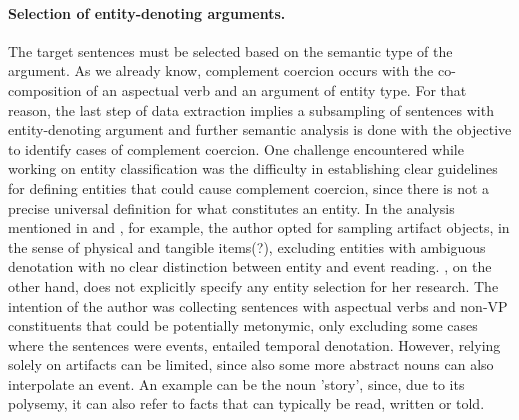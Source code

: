 \documentclass{article}
\begin{document}
\paragraph{Selection of entity-denoting arguments.} The target sentences must be selected based on the semantic type of the argument. As we already know, complement coercion occurs with the co-composition of an aspectual verb and an argument of entity type. For that reason, the last step of data extraction implies a subsampling of sentences with entity-denoting argument and further semantic analysis is done with the objective to identify cases of complement coercion. 
One challenge encountered while working on entity classification was the difficulty in establishing clear guidelines for defining entities that could cause complement coercion, since there is not a precise universal definition for what constitutes an entity. In the analysis mentioned in \textcite{rud_covert_2011} and \textcite{zarcone_logical_2012}, for example, the author opted for sampling artifact objects, in the sense of physical and tangible %
items(?), excluding entities with ambiguous denotation with no clear distinction between entity and event reading. %
\textcite{verspoor_conventionality-governed_1997}, on the other hand, does not explicitly specify any
entity selection for her research. The intention of the author was collecting sentences with aspectual verbs and non-VP constituents that could be potentially metonymic, only excluding some cases where the sentences were events, entailed temporal denotation.
However, relying solely on artifacts can be limited, since also some more abstract nouns can also interpolate an event. An example can be the noun 'story', since, due to its polysemy, it can also refer to facts that can typically be read, written or told. %
\end{document}
